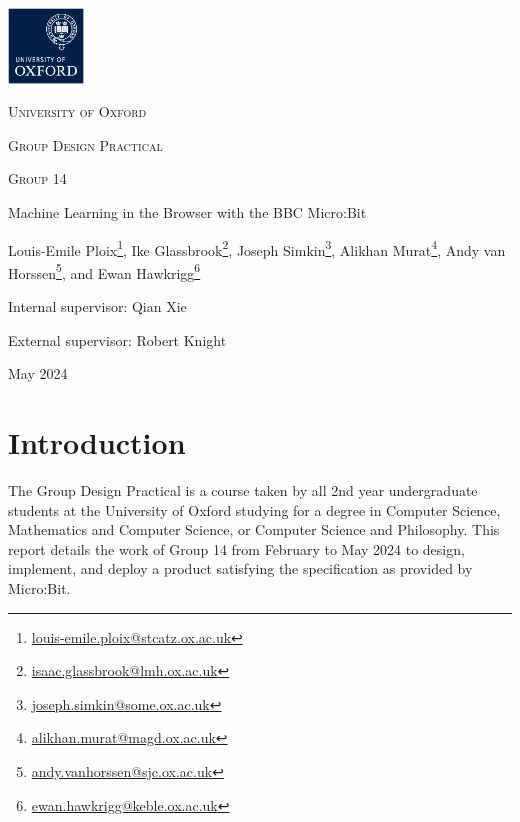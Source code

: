 \documentclass{article}
\begin{document}
\begin{titlepage}
  \centering
  \hphantom{}\par
  \vspace{2cm}
  \includegraphics[width=0.15\textwidth]{logo.png}\par\vspace{0.5cm}
  {\LARGE \textsc{University of Oxford}\par}\vspace{0.5cm}
  {\Large \textsc{Group Design Practical}\par}\vspace{0.5cm}
  {\large \textsc{Group 14}\par}\vspace{0.7cm}
  {\Huge Machine Learning in the Browser with the BBC Micro:Bit\par}\vspace{0.8cm}
  {\large Louis-Emile Ploix\footnote{\href{mailto:louis-emile.ploix@stcatz.ox.ac.uk}{louis-emile.ploix@stcatz.ox.ac.uk}}, Ike Glassbrook\footnote{\href{mailto:isaac.glassbrook@lmh.ox.ac.uk}{isaac.glassbrook@lmh.ox.ac.uk}}, Joseph Simkin\footnote{\href{mailto:joseph.simkin@some.ox.ac.uk}{joseph.simkin@some.ox.ac.uk}}, Alikhan Murat\footnote{\href{mailto:alikhan.murat@magd.ox.ac.uk}{alikhan.murat@magd.ox.ac.uk}}, Andy van Horssen\footnote{\href{mailto:andy.vanhorssen@sjc.ox.ac.uk}{andy.vanhorssen@sjc.ox.ac.uk}}, and Ewan Hawkrigg\footnote{\href{mailto:ewan.hawkrigg@keble.ox.ac.uk}{ewan.hawkrigg@keble.ox.ac.uk}}\par}\vspace{0.7cm}
  {\large Internal supervisor: Qian Xie\par \vspace{0.3cm} External supervisor: Robert Knight \par}\vspace{1cm}
  {\Large May 2024}
\end{titlepage}

\tableofcontents

\section{Introduction}%
\label{sec:intro}

The Group Design Practical is a course taken by all 2nd year undergraduate students at the University of Oxford studying for a degree in Computer Science, Mathematics and Computer Science, or Computer Science and Philosophy. This report details the work of Group 14 from February to May 2024 to design, implement, and deploy a product satisfying the specification as provided by Micro:Bit. \\
\end{document}
